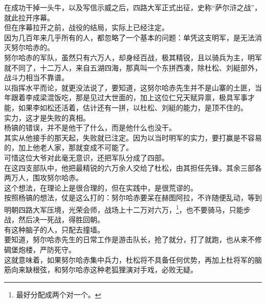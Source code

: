 \begin{multicols}{\theparacolNo}
在成功干掉一头牛，以及写信示威之后，四路大军正式出征，史称“萨尔浒之战”，就此拉开序幕。\\

但在序幕拉开之前，战役的结局，实际上已经注定。\\

因为几百年来几乎所有的人，都忽略了一个基本的问题：单凭这支明军，是无法消灭努尔哈赤的。\\

努尔哈赤的军队，虽然只有六万人，却身经百战，极其精锐，且以骑兵为主，明军就不同了，十二万人，来自五湖四海，那真叫一个东拼西凑，除杜松、刘綎部外，战斗力相当不靠谱。\\

以指挥水平而论，就更没法说了，要知道，这努尔哈赤先生并不是山寨的土匪，当年跟着李成梁混饭吃，那是见过大世面的，加上这位仁兄天赋异禀，极具军事才能，如果李如松还活着，估计还有一拼，以杜松、刘綎的能力，是顶不住的。\\

实力，这才是失败的真相。\\

杨镐的错误，并不是他干了什么，而是他什么也没干。\\

其实从他接手的那天起，失败就已注定。因为以当时明军的实力，要打赢是不容易的，加上他老人家，那就变成不可能了。\\

可惜这位大爷对此毫无意识，还把军队分成了四部。\\

在这四支部队中，他把最精锐的六万余人交给了杜松，由其担任先锋。其余三部各两万人，围攻努尔哈赤。\\

这个想法，在理论上是很合理的，但在实践中，是很荒谬的。\\

按照杨镐的想法，仗是这么打的：努尔哈赤要呆在赫图阿拉，不许随便乱动，等到明朝四路大军压境，光荣会师，战场上十二万对六万，\footnote{最好分配成两个对一个。}，也不要骑马，只能步战，然后决一死战，得胜回朝。\\

有这种脑子的人，只配去撞墙。\\

要知道，努尔哈赤先生的日常工作是游击队长，抢了就分，打了就跑，也从来不修碉堡炮楼，严防死守。\\

这就意味着，如果努尔哈赤集中兵力，杜松将不具备任何优势，再加上杜将军的脑筋向来缺根弦，和努尔哈赤这种老狐狸演对手戏，必败无疑。\\


\end{multicols}
